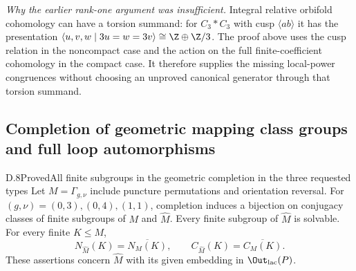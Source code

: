 \noindent\emph{Why the earlier rank-one argument was insufficient.}
Integral relative orbifold cohomology can have a torsion summand:
for $C_3*C_3$ with cusp $\langle ab\rangle$ it has the presentation
$\langle u,v,w\mid3u=w=3v\rangle\cong\Z\oplus\Z/3$.
The proof above uses the cusp relation in the noncompact case and the
action on the full finite-coefficient cohomology in the compact case.
It therefore supplies the missing local-power congruences without
choosing an unproved canonical generator through that torsion summand.

\subsection{Completion of geometric mapping class groups and full loop automorphisms}

\begin{claim}{D.8}{Proved}{All finite subgroups in the geometric completion in the three requested types}
Let $M=\Gamma_{g,\nu}$ include puncture permutations and orientation reversal. For $(g,\nu)=(0,3),(0,4),(1,1)$, completion induces a bijection on conjugacy classes of finite subgroups of $M$ and $\widehat M$. Every finite subgroup of $\widehat M$ is solvable. For every finite $K\leq M$,
\[
 N_{\widehat M}(K)=\overline{N_M(K)},\qquad
 C_{\widehat M}(K)=\overline{C_M(K)}.
\]
These assertions concern $\widehat M$ with its given embedding in $\Out_{\rm lac}(P)$.
\end{claim}
